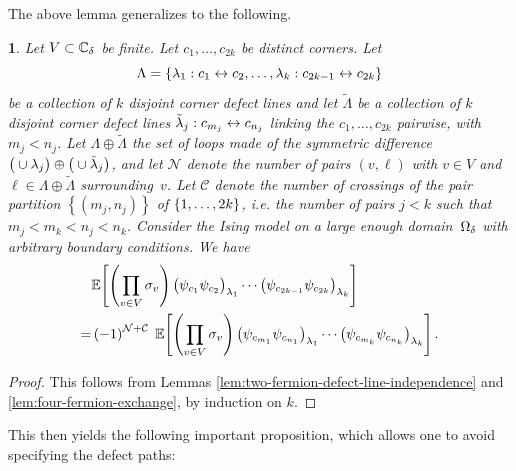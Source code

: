 \documentclass[12pt,oneside,english]{amsart}
\numberwithin{equation}{section}
\numberwithin{figure}{section}
\theoremstyle{plain}
\theoremstyle{plain}
\theoremstyle{plain}
\newtheorem{prop}[thm]{\protect\propositionname}
\theoremstyle{plain}
\theoremstyle{remark}
\theoremstyle{definition}
\theoremstyle{plain}
\theoremstyle{plain}
\numberwithin{thm}{section}
\newcommand{\kallemod}[1]{{\color{kallecol} {#1}}}
\providecommand{\propositionname}{Proposition}
\providecommand{\propositionname}{Proposition}
\providecommand{\propositionname}{Proposition}
\providecommand{\propositionname}{Proposition}
\begin{document}
The above lemma generalizes to the following.
\begin{prop}
\label{prop:n-fermion-exchange}Let $V\subset{\mathbb{C}_{{\delta}}}$
be finite. Let $c_{1},\ldots,c_{2k}$ be distinct corners.
Let
\[\Lambda=\left\{ {\lambda}_{1}:c_{1}\leftrightarrow 
c_{2},\ldots,{\lambda}_{k}:c_{2k-1}\leftrightarrow c_{2k}\right\} \]
be a collection of $k$ disjoint corner defect lines and let $\tilde{\Lambda}$
be a collection of $k$ disjoint corner defect lines 
$\tilde{{\lambda}}_{j}: c_{m_{j}}\leftrightarrow c_{n_{j}}$
linking the $c_{1},\ldots,c_{2k}$ pairwise, with $m_{j}<n_{j}$.
Let $\Lambda\oplus\tilde{\Lambda}$ the set of loops made of the symmetric
difference 
${\big(\cup{\lambda}_{j}\big) 
\oplus \big(\cup\tilde{{\lambda}}_{j}\big)}$,
and let $\mathcal{N}$ denote the number of pairs $\left(v,\ell\right)$
with $v\in V$ and $\ell\in\Lambda\oplus\tilde{\Lambda}$ surrounding~$v$. Let 
$\mathcal{C}$ denote the number of crossings of the pair
partition $\left\{ \left(m_{j},n_{j}\right)\right\} $
of $\left\{  1, \ldots, 2k  \right\} $,
i.e. the number of pairs $j<k$ such that $m_{j}<m_{k}<n_{j}<n_{k}$.
Consider the Ising model on a large enough domain~${{\Omega}}_{{\delta}}$ with arbitrary
boundary conditions. We have 
\begin{align*}
& \mathbb{E} \! \left[ { \left(\prod_{v\in V}{\sigma}_{v}\right)
    \big( {\psi}_{c_{1}} {\psi}_{c_{2}} \big)_{{\lambda}_{1}}
    \cdots
    \big( {\psi}_{c_{2k-1}} {\psi}_{c_{2k}} \big)_{{\lambda}_{k}}
  } \right] \\
= & \left(-1\right)^{\mathcal{N}+\mathcal{C}} \;
  \mathbb{E} \! \left[ {
    \left( \prod_{v\in V} {\sigma}_{v} \right)
    \big( {\psi}_{c_{m_{1}}} {\psi}_{c_{n_{1}}} \big)_{{\lambda}_{1}}
    \cdots
    \big({\psi}_{c_{m_{k}}} {\psi}_{c_{n_{k}}} \big)_{{\lambda}_{k}}
  } \right] .
\end{align*}
\end{prop}
\begin{proof}
This follows from Lemmas \ref{lem:two-fermion-defect-line-independence}
and \ref{lem:four-fermion-exchange}, by induction on $k$. 
\end{proof}
This then yields the following important proposition, which allows
one to avoid specifying the defect paths: 
\end{document}
